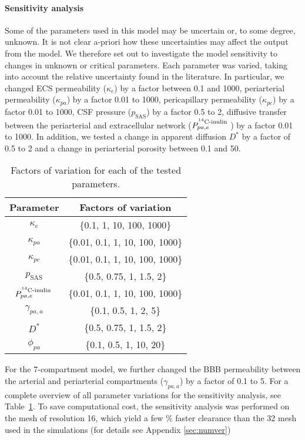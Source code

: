 \documentclass[a4paper,11pt]{article}
\newcommand{\1}{^{(1)}}
\newcommand{\2}{^{(2)}}
\newcommand{\Cinulin}{$\prescript{14}{}{\text{C}}$-inulin }
\begin{document}
\paragraph{Sensitivity analysis}
Some of the parameters used in this model may be uncertain or, to some degree, unknown. It is not clear a-priori how these uncertainties may affect the output from the model. We therefore set out to investigate the model sensitivity to changes in unknown or critical parameters. Each parameter was varied, taking into account the relative uncertainty found in the literature. In particular, we changed ECS permeability ($\kappa_e$) by a factor between 0.1 and 1000, periarterial permeability ($\kappa_{pa}$) by a factor 0.01 to 1000, pericapillary permeability ($\kappa_{pc}$) by a factor 0.01 to 1000, CSF pressure ($p_\text{SAS}$) by a factor 0.5 to 2, diffusive transfer between the periarterial and extracellular network ($P^{\text{\Cinulin}}_{pa,e}$) by a factor 0.01 to 1000. In addition, we tested a change in apparent diffusion $D^{*}$ by a factor of 0.5 to 2 and a change in periarterial porosity between 0.1 and 50. 
\begin{table}[h]
    \centering
    \begin{tabular}{c|c}
          Parameter & Factors of variation \\
         \hline 
         $\kappa_e$ & \{0.1, 1, 10, 100, 1000\} \\
         $\kappa_{pa}$ & \{0.01, 0.1, 1, 10, 100, 1000\} \\
         $\kappa_{pc}$ & \{0.01, 0.1, 1, 10, 100, 1000\} \\
         $p_\text{SAS}$ & \{0.5, 0.75, 1, 1.5, 2\} \\
         $P^{\text{\Cinulin}}_{pa,e}$ & \{0.01, 0.1, 1, 10, 100, 1000\} \\
         $\gamma_{pa , a}$ & \{0.1, 0.5, 1, 2, 5\} \\
         $D^{*}$ & \{0.5, 0.75, 1, 1.5, 2\} \\
         $\phi_{pa}$ & \{0.1, 0.5, 1, 10, 20\}
    \end{tabular}
    \caption{Factors of variation for each of the tested parameters.}
    \label{tab:variations}
\end{table}

For the 7-compartment model, we further changed the BBB permeability between the arterial and periarterial compartments ($\gamma_{pa, a}$) by a factor of 0.1 to 5. For a complete overview of all parameter variations for the sensitivity analysis, see Table~\ref{tab:variations}. To save computational cost, the sensitivity analysis was performed on the mesh of resolution 16, which yield a few \% faster clearance than the 32 mesh used in the simulations (for details see Appendix \ref{sec:numver})
\end{document}
